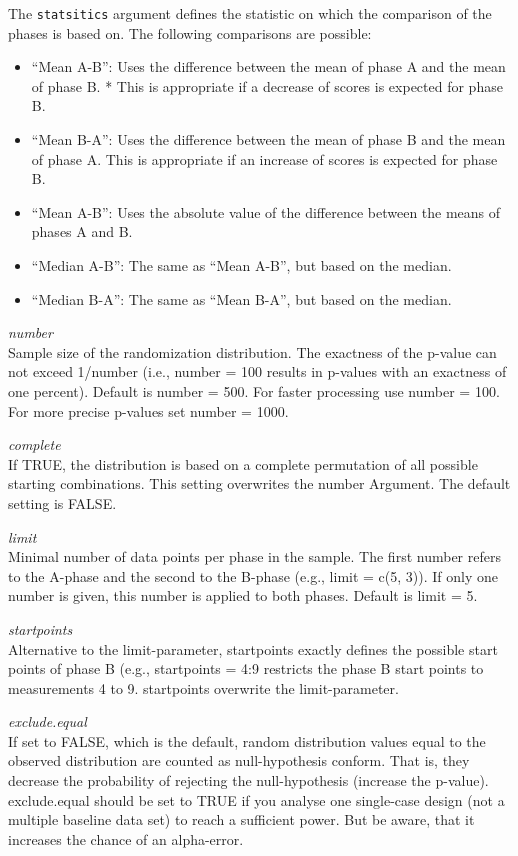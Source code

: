 \documentclass[
  letterpaper,
  DIV=11,
  numbers=noendperiod]{scrreprt}
\providecommand{\tightlist}{%
  \setlength{\itemsep}{0pt}\setlength{\parskip}{0pt}}\usepackage{longtable,booktabs,array}
\begin{document}
The \texttt{statsitics} argument defines the statistic on which the
comparison of the phases is based on. The following comparisons are
possible:

\begin{itemize}
\tightlist
\item
  ``Mean A-B'': Uses the difference between the mean of phase A and the
  mean of phase B. * This is appropriate if a decrease of scores is
  expected for phase B.
\item
  ``Mean B-A'': Uses the difference between the mean of phase B and the
  mean of phase A. This is appropriate if an increase of scores is
  expected for phase B.
\item
  ``Mean \textbar A-B\textbar{}'': Uses the absolute value of the
  difference between the means of phases A and B.
\item
  ``Median A-B'': The same as ``Mean A-B'', but based on the median.
\item
  ``Median B-A'': The same as ``Mean B-A'', but based on the median.
\end{itemize}

\emph{number}\\
Sample size of the randomization distribution. The exactness of the
p-value can not exceed 1/number (i.e., number = 100 results in p-values
with an exactness of one percent). Default is number = 500. For faster
processing use number = 100. For more precise p-values set number =
1000.

\emph{complete}\\
If TRUE, the distribution is based on a complete permutation of all
possible starting combinations. This setting overwrites the number
Argument. The default setting is FALSE.

\emph{limit}\\
Minimal number of data points per phase in the sample. The first number
refers to the A-phase and the second to the B-phase (e.g., limit = c(5,
3)). If only one number is given, this number is applied to both phases.
Default is limit = 5.

\emph{startpoints}\\
Alternative to the limit-parameter, startpoints exactly defines the
possible start points of phase B (e.g., startpoints = 4:9 restricts the
phase B start points to measurements 4 to 9. startpoints overwrite the
limit-parameter.

\emph{exclude.equal}\\
If set to FALSE, which is the default, random distribution values equal
to the observed distribution are counted as null-hypothesis conform.
That is, they decrease the probability of rejecting the null-hypothesis
(increase the p-value). exclude.equal should be set to TRUE if you
analyse one single-case design (not a multiple baseline data set) to
reach a sufficient power. But be aware, that it increases the chance of
an alpha-error.
\end{document}
